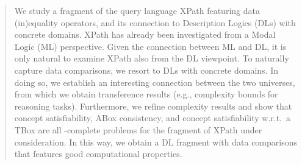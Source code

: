 \begin{abstract}
    We study a fragment of the query language XPath featuring data (in)equality operators, and its connection to Description Logics (DLs) with concrete domains. XPath has already been investigated from a Modal Logic (ML) perspective. Given the connection between ML and DL, it is only natural to examine XPath also from the DL viewpoint.
    To naturally capture data comparisons, we resort to DLs with concrete domains. In doing so, we establish an interesting connection between the two universes, from which we obtain transference results (e.g., complexity bounds for reasoning tasks). 
    Furthermore, we refine complexity results and show that concept satisfiability, ABox consistency, and concept satisfiability w.r.t.\ a TBox are all \np-complete problems for the fragment of XPath under consideration. In this way, we obtain a DL fragment with data comparisons that features good computational properties.
\end{abstract}
